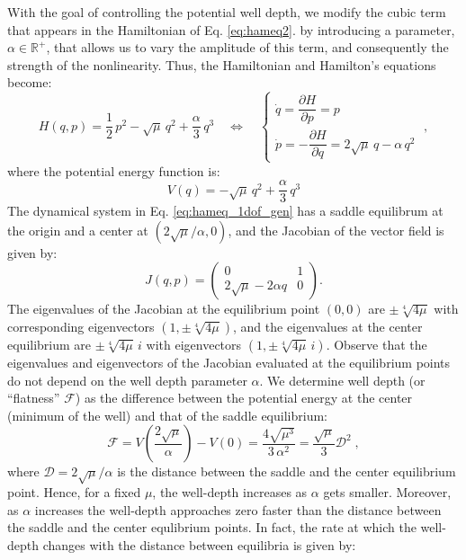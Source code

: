 \documentclass[8pt]{article}
\begin{document}
\smallskip

With the goal of controlling the potential well depth, we modify the cubic term that appears in the Hamiltonian of Eq. \eqref{eq:hameq2}. by introducing a parameter, $\alpha \in \mathbb{R}^{+}$, that allows us to vary the amplitude of this term, and consequently the strength of the nonlinearity. Thus, the Hamiltonian and Hamilton's equations become:
\begin{equation}
H(q,p) = \frac{1}{2} \, p^2 - \sqrt{\mu} \, q^2 + \frac{\alpha}{3} \, q^3 \quad \Leftrightarrow \quad \begin{cases}
\dot{q} = \dfrac{\partial H}{\partial p} = p \\[.4cm]
\dot{p} = -\dfrac{\partial H}{\partial q} = 2\sqrt{\mu} \, q - \alpha \, q^2
\end{cases} \;,
\label{eq:hameq_1dof_gen}
\end{equation}
where the potential energy function is:
\begin{equation}
V(q) =  - \sqrt{\mu} \, q^2 + \dfrac{\alpha}{3} \, q^3
\label{eq:pot_gen1D}
\end{equation} 
The dynamical system in Eq. \eqref{eq:hameq_1dof_gen} has a saddle equilibrum at the origin and a center at  $\left(2\sqrt{\mu}/ \alpha,0\right)$, and the Jacobian of the vector field is given by:
\begin{equation}
J(q,p) = 
\begin{pmatrix}
0 & 1 \\
2 \sqrt{\mu} -2 \alpha q & 0
\end{pmatrix}.
\end{equation}
The eigenvalues of the Jacobian at the equilibrium point $(0,0)$ are $\pm \sqrt[4]{4\mu}$ with corresponding eigenvectors $(1,\pm \sqrt[4]{4\mu})$, and the eigenvalues at the center equilibrium are $\pm \sqrt[4]{4\mu} \, i$ with eigenvectors $(1,\pm \sqrt[4]{4\mu} \, i)$. Observe that the eigenvalues and eigenvectors of the Jacobian evaluated at the equilibrium points do not depend on the well depth parameter $\alpha$. We determine well depth (or ``flatness'' $\mathcal{F}$) as the difference between the potential energy at the center (minimum of the well) and that of the saddle equilibrium:
\begin{equation}
\mathcal{F} = V\left(\frac{2\sqrt{\mu}}{\alpha}\right) - V(0)= \frac{4 \sqrt{\mu^3}}{3 \, \alpha^2} = \dfrac{\sqrt{\mu}}{3} \mathcal{D}^2 \; ,
\end{equation}
where $\mathcal{D} = 2\sqrt{\mu} / \alpha$ is the distance between the saddle and the center equilibrium point. Hence, for a fixed $\mu$, the well-depth increases as $\alpha$ gets smaller. Moreover, as $\alpha$ increases the well-depth approaches zero faster than the distance between the saddle and the center equlibrium points. In fact, the rate at which the well-depth changes with the distance between equilibria is given by:
\end{document}
